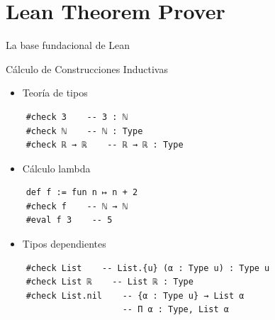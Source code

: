 \documentclass{beamer}
\begin{document}
\section{Lean Theorem Prover}


\begin{frame}[fragile]{La base fundacional de Lean}

  \begin{center}
    \large{Cálculo de Construcciones Inductivas}
  \end{center}

  \begin{itemize}
    \item Teoría de tipos
  \end{itemize}

  \begin{lstlisting}
    #check 3    -- 3 : ℕ    
    #check ℕ    -- ℕ : Type
    #check ℝ → ℝ    -- ℝ → ℝ : Type \end{lstlisting}

  \begin{itemize}
    \item Cálculo lambda
  \end{itemize}

  \begin{lstlisting}
    def f := fun n ↦ n + 2
    #check f    -- ℕ → ℕ
    #eval f 3    -- 5 \end{lstlisting}

  \begin{itemize}
    \item Tipos dependientes
  \end{itemize}

  \begin{lstlisting}
    #check List    -- List.{u} (α : Type u) : Type u
    #check List ℝ    -- List ℝ : Type
    #check List.nil    -- {α : Type u} → List α
                       -- Π α : Type, List α \end{lstlisting}

\end{frame}
\end{document}
